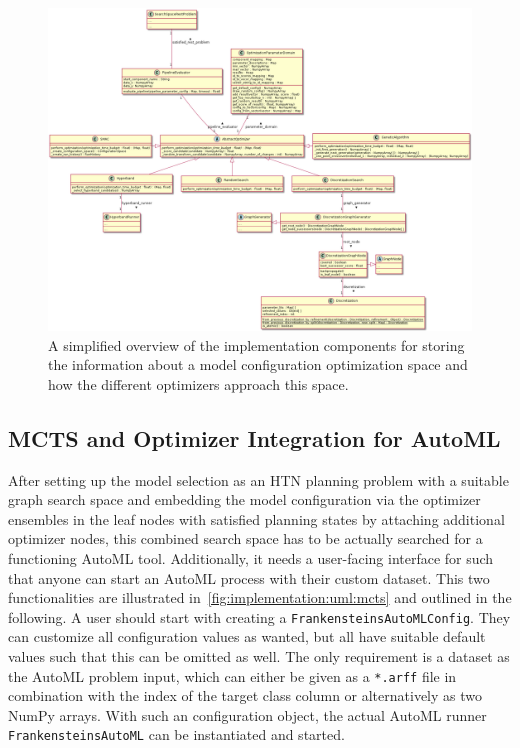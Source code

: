 \begin{figure}[ht!]
    \centering
    \includegraphics[angle=90,origin=c,width=\textwidth,height=0.9\textheight,keepaspectratio]{gfx/Figures/Implementation/optimization/PipelineOptimization.png}
    \caption{A simplified overview of the implementation components for storing the information about a model configuration optimization space and how the different optimizers approach this space.}
    \label{fig:implementation:uml:optimization}
\end{figure}

\subsection{MCTS and Optimizer Integration for AutoML}
\label{sec:implementation:components:mcts}
After setting up the model selection as an HTN planning problem with a suitable graph search space and embedding the model configuration via the optimizer ensembles in the leaf nodes with satisfied planning states by attaching additional optimizer nodes, this combined search space has to be actually searched for a functioning AutoML tool.
Additionally, it needs a user-facing interface for such that anyone can start an AutoML process with their custom dataset.
This two functionalities are illustrated in~\ref{fig:implementation:uml:mcts} and outlined in the following.\newline
A user should start with creating a \texttt{FrankensteinsAutoMLConfig}.
They can customize all configuration values as wanted, but all have suitable default values such that this can be omitted as well.
The only requirement is a dataset as the AutoML problem input, which can either be given as a \texttt{*.arff} file in combination with the index of the target class column or alternatively as two NumPy arrays.
With such an configuration object, the actual AutoML runner \texttt{FrankensteinsAutoML} can be instantiated and started.

